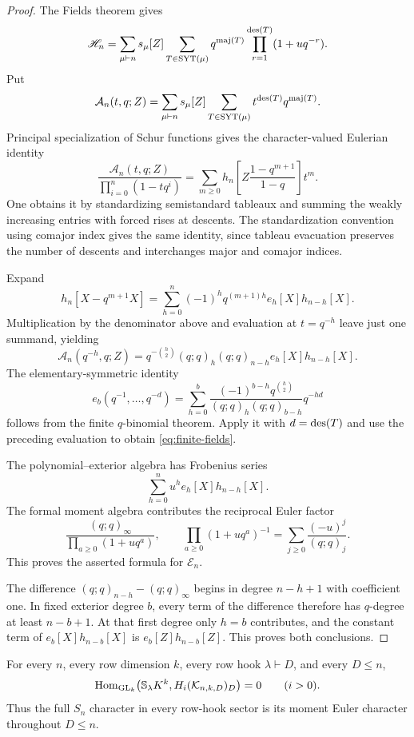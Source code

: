\begin{proof}
The Fields theorem \cite[Theorem~5.2 and equation~(2.5)]{MRW} gives
\[
 \mathscr H_n
 =\sum_{\mu\vdash n}s_\mu[Z]
      \sum_{T\in\operatorname{SYT}(\mu)}
        q^{\operatorname{maj}(T)}
        \prod_{r=1}^{\operatorname{des}(T)}(1+uq^{-r}).
\]
Put
\[
 \mathcal A_n(t,q;Z)=
   \sum_{\mu\vdash n}s_\mu[Z]
       \sum_{T\in\operatorname{SYT}(\mu)}t^{\operatorname{des}(T)}q^{\operatorname{maj}(T)}.
\]
Principal specialization of Schur functions gives the
character-valued Eulerian identity
\[
 \frac{\mathcal A_n(t,q;Z)}
      {\prod_{i=0}^n(1-tq^i)}
  =\sum_{m\ge0}
       h_n\left[Z\frac{1-q^{m+1}}{1-q}\right]t^m.
\]
One obtains it by standardizing semistandard tableaux and summing
the weakly increasing entries with forced rises at descents.
The standardization convention using comajor index gives the same
identity, since tableau evacuation preserves the number of
descents and interchanges major and comajor indices.

Expand
\[
 h_n[X-q^{m+1}X]
   =\sum_{h=0}^n(-1)^h q^{(m+1)h}e_h[X]h_{n-h}[X].
\]
Multiplication by the denominator above and evaluation at
$t=q^{-h}$ leave just one summand, yielding
\[
 \mathcal A_n(q^{-h},q;Z)
 =q^{-\binom h2}(q;q)_h(q;q)_{n-h}e_h[X]h_{n-h}[X].
\]
The elementary-symmetric identity
\[
 e_b(q^{-1},\ldots,q^{-d})
  =\sum_{h=0}^b
       \frac{(-1)^{b-h}q^{\binom h2}}
            {(q;q)_h(q;q)_{b-h}}q^{-hd}
\]
follows from the finite $q$-binomial theorem. Apply it with
$d=\operatorname{des}(T)$ and use the preceding evaluation to obtain
\eqref{eq:finite-fields}.

The polynomial--exterior algebra has Frobenius series
\[
 \sum_{h=0}^n u^h e_h[X]h_{n-h}[X].
\]
The formal moment algebra contributes the reciprocal Euler factor
\[
 \frac{(q;q)_\infty}{\prod_{a\ge0}(1+uq^a)},\qquad
 \prod_{a\ge0}(1+uq^a)^{-1}
     =\sum_{j\ge0}\frac{(-u)^j}{(q;q)_j}.
\]
This proves the asserted formula for $\mathscr E_n$.

The difference $(q;q)_{n-h}-(q;q)_\infty$ begins in degree
$n-h+1$ with coefficient one. In fixed exterior degree $b$,
every term of the difference therefore has $q$-degree at
least $n-b+1$. At that first degree only $h=b$ contributes,
and the constant term of $e_b[X]h_{n-b}[X]$ is
$e_b[Z]h_{n-b}[Z]$. This proves both conclusions.
\end{proof}

\begin{theorem}
\label{thm:hook-acyclicity}
For every $n$, every row dimension $k$, every row hook
$\lambda\vdash D$, and every $D\le n$,
\[
 \operatorname{Hom}_{\operatorname{GL}_k}\!\left(
   \mathbb S_\lambda K^k,H_i(\mathcal K_{n,k,D})_D\right)=0
                  \qquad(i>0).
\]
Thus the full $S_n$ character in every row-hook sector is its
moment Euler character throughout $D\le n$.
\end{theorem}

